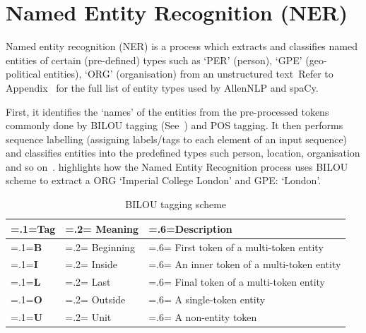 

\section{Named Entity Recognition (NER)} \label{named_ents}

Named entity recognition (NER) is a process which extracts and classifies named entities of certain (pre-defined) types such as `PER' (person), `GPE' (geo-political entities), `ORG' (organisation) from an unstructured text~\cite{ieee_named_entity}Refer to Appendix~ for the full list of entity types used by AllenNLP and spaCy. 

First, it identifies the `names' of the entities from the pre-processed tokens commonly done by BILOU tagging (See~) and POS tagging. It then performs sequence labelling (assigning labels/tags to each element of an input sequence) and classifies entities into the predefined types such person, location, organisation and so on~\cite{ieee_named_entity}.  highlights how the Named Entity Recognition process uses BILOU scheme to extract a ORG `Imperial College London' and GPE: `London'.

\begin{table}[H]
    \centering 
    \renewcommand{\arraystretch}{1.1}
    \begin{tabularx}{0.7\textwidth}{|>{\hsize=.1\hsize\linewidth=\hsize}X|>{\hsize=.2\hsize\linewidth=\hsize}X|>{\hsize=.6\hsize\linewidth=\hsize}X|} 
    \hline
    \textbf{Tag} & \textbf{Meaning} &\textbf{Description}  \\
    \hline
    \textbf{B} & Beginning & First token of a multi-token entity\\
    \textbf{I}  & Inside & An inner token of a multi-token entity\\
     \textbf{L}  & Last & Final token of a multi-token entity\\
     \textbf{O}  & Outside & A single-token entity\\
     \textbf{U} & Unit & A non-entity token\\
     \hline
    \end{tabularx}
\caption{BILOU tagging scheme}
\label{bilou}
\end{table}


